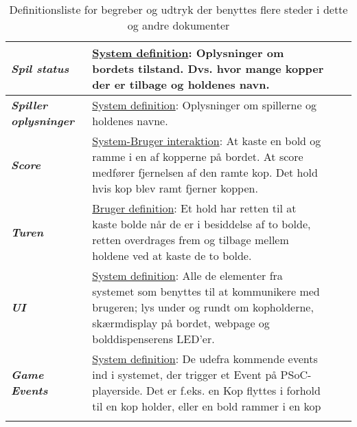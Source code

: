 \documentclass[Kravspecifikation/Kravspec_Main.tex]{subfiles}
\begin{document}
\begin{longtable}{|>{\centering\arraybackslash}m{3cm}|>{\RaggedRight\arraybackslash}m{10cm}| p{} | p{}|}
        \hline
        \textit{\textbf{Spil status}} & \underline{System definition}:
        Oplysninger om bordets tilstand. Dvs. hvor mange kopper der er tilbage og holdenes navn. \\
        \hline
        \textit{\textbf{Spiller oplysninger}} & \underline{System definition}:
        Oplysninger om spillerne og holdenes navne. \\
        \hline
        \textit{\textbf{Score}} & \underline{System-Bruger interaktion}:
        At kaste en bold og ramme i en af kopperne på bordet. At score medfører fjernelsen af den ramte kop. Det hold hvis kop blev ramt fjerner koppen. \\
        \hline
        \textit{\textbf{Turen}} & \underline{Bruger definition}:
        Et hold har retten til at kaste bolde når de er i besiddelse af to bolde, retten overdrages frem og tilbage mellem holdene ved at kaste de to bolde. \\
        \hline
        
        \textit{\textbf{UI}} & \underline{System definition}:
        Alle de elementer fra systemet som benyttes til at kommunikere med brugeren; lys under og rundt om kopholderne, skærmdisplay på bordet, webpage og bolddispenserens LED'er.\\
        \hline
        
        \textit{\textbf{Game Events}} & \underline{System definition}:
        De udefra kommende events ind i systemet, der trigger et Event på PSoC-playerside. Det er f.eks. en Kop flyttes i forhold til en kop holder, eller en bold rammer i en kop\\
        \hline
    \caption{Definitionsliste for begreber og udtryk der benyttes flere steder i dette og andre dokumenter}
    \label{tab:def_liste}
    \end{longtable}
\end{document}
